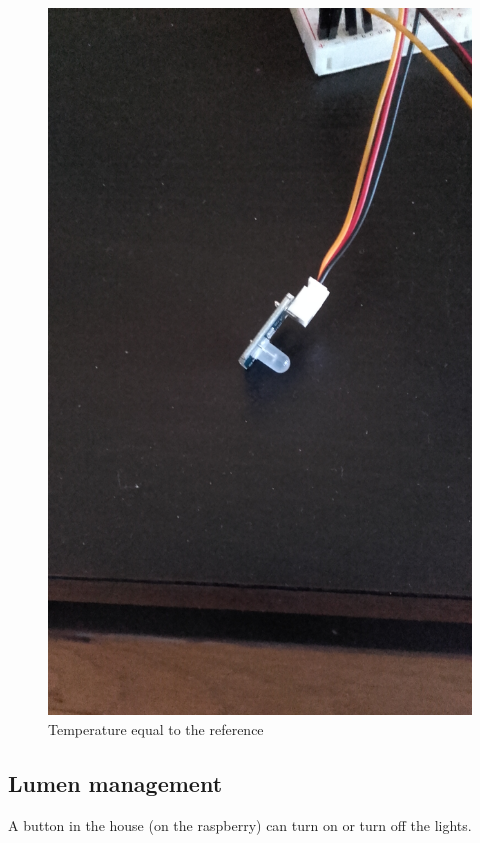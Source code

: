 \documentclass[10pt]{article}
\begin{document}
\begin{figure}[H]
  \centering
  \includegraphics[width=\textwidth]{../imgs/goodTemperature.jpg}
  \caption{\label{goodTemp}Temperature equal to the reference}
\end{figure}

\subsection{Lumen management}

A button in the house (on the raspberry) can turn on or turn off the lights.
\end{document}
